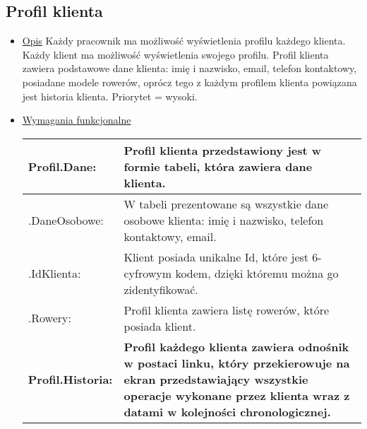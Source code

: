 \documentclass[a4paper,20pt]{article}
\begin{document}
\subsection{Profil klienta}

\begin{itemize}
\item \underline{Opis} 
\newline
\newline
Każdy pracownik ma możliwość wyświetlenia profilu każdego klienta. Każdy klient ma możliwość wyświetlenia swojego profilu. Profil klienta zawiera podstawowe dane klienta: imię i nazwisko, email, telefon kontaktowy, posiadane modele rowerów, oprócz tego z każdym profilem klienta powiązana jest historia klienta. Priorytet = wysoki.
\newline

\item \underline{Wymagania funkcjonalne}

\begin{center}
\begin{tabularx}{\textwidth}[t]{XX}


\arrayrulecolor{black}\hline
\textbf{Profil.Dane:} & \textbf{Profil klienta przedstawiony jest w formie tabeli, która zawiera dane klienta.} \\

\hline

\quad .DaneOsobowe: & 
\begin{minipage}[t]{\linewidth}%
W tabeli prezentowane są wszystkie dane osobowe klienta: imię i nazwisko, telefon kontaktowy, email.    
\end{minipage}\\

\quad .IdKlienta: & 
\begin{minipage}[t]{\linewidth}%
Klient posiada unikalne Id, które jest 6-cyfrowym kodem, dzięki któremu można go zidentyfikować.   
\end{minipage}\\

\quad \quad .Rowery: & 
\begin{minipage}[t]{\linewidth}%
Profil klienta zawiera listę rowerów, które posiada klient. 
\end{minipage}\\



\arrayrulecolor{black}\hline
\textbf{Profil.Historia:} & \textbf{Profil każdego klienta zawiera odnośnik w postaci linku, który przekierowuje na ekran przedstawiający wszystkie operacje wykonane przez klienta wraz z datami w kolejności chronologicznej.} \\


\end{tabularx}
\end{center}
\end{itemize}
\end{document}
